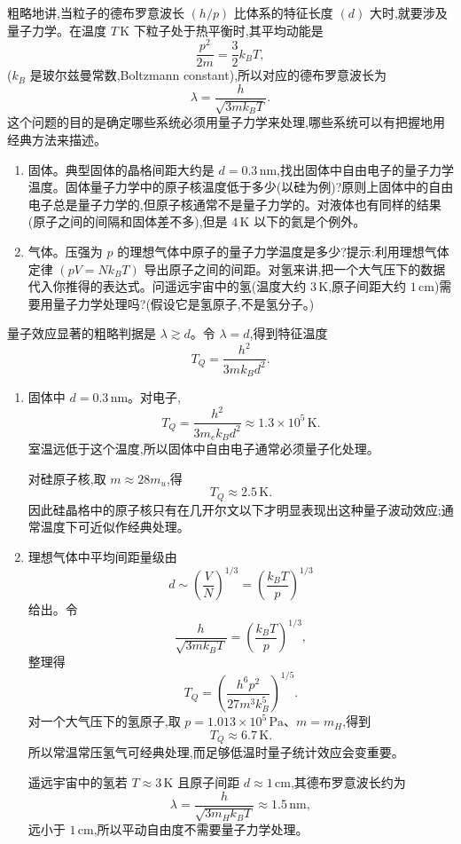 \begin{question}
粗略地讲,当粒子的德布罗意波长 $(h/p)$ 比体系的特征长度 $(d)$ 大时,就要涉及量子力学。在温度 $T\,\mathrm{K}$ 下粒子处于热平衡时,其平均动能是
\[
\frac{p^2}{2m}=\frac{3}{2}k_B T,
\]
($k_B$ 是玻尔兹曼常数,Boltzmann constant),所以对应的德布罗意波长为
\[
\lambda=\frac{h}{\sqrt{3mk_B T}}.
\tag{1.45}
\]
这个问题的目的是确定哪些系统必须用量子力学来处理,哪些系统可以有把握地用经典方法来描述。
\begin{enumerate}
\item 固体。典型固体的晶格间距大约是 $d=0.3\,\mathrm{nm}$,找出固体中自由电子的量子力学温度。固体量子力学中的原子核温度低于多少(以硅为例)?原则上固体中的自由电子总是量子力学的,但原子核通常不是量子力学的。对液体也有同样的结果(原子之间的间隔和固体差不多),但是 $4\,\mathrm{K}$ 以下的氦是个例外。
\item 气体。压强为 $p$ 的理想气体中原子的量子力学温度是多少?提示:利用理想气体定律 $(pV=Nk_BT)$ 导出原子之间的间距。对氢来讲,把一个大气压下的数据代入你推得的表达式。问遥远宇宙中的氢(温度大约 $3\,\mathrm{K}$,原子间距大约 $1\,\mathrm{cm}$)需要用量子力学处理吗?(假设它是氢原子,不是氢分子。)
\end{enumerate}
\end{question}
\begin{solution}
量子效应显著的粗略判据是 $\lambda\gtrsim d$。令 $\lambda=d$,得到特征温度
\[
T_Q=\frac{h^2}{3mk_Bd^2}.
\]
\begin{enumerate}
\item 固体中 $d=0.3\,\mathrm{nm}$。对电子,
\[
T_Q=\frac{h^2}{3m_ek_Bd^2}\approx 1.3\times10^5\,\mathrm{K}.
\]
室温远低于这个温度,所以固体中自由电子通常必须量子化处理。

对硅原子核,取 $m\approx 28m_u$,得
\[
T_Q\approx 2.5\,\mathrm{K}.
\]
因此硅晶格中的原子核只有在几开尔文以下才明显表现出这种量子波动效应;通常温度下可近似作经典处理。
\item 理想气体中平均间距量级由
\[
d\sim\left(\frac{V}{N}\right)^{1/3}=\left(\frac{k_BT}{p}\right)^{1/3}
\]
给出。令
\[
\frac{h}{\sqrt{3mk_BT}}=\left(\frac{k_BT}{p}\right)^{1/3},
\]
整理得
\[
T_Q=\left(\frac{h^6p^2}{27m^3k_B^5}\right)^{1/5}.
\]
对一个大气压下的氢原子,取 $p=1.013\times10^5\,\mathrm{Pa}$、$m=m_H$,得到
\[
T_Q\approx 6.7\,\mathrm{K}.
\]
所以常温常压氢气可经典处理,而足够低温时量子统计效应会变重要。

遥远宇宙中的氢若 $T\approx3\,\mathrm{K}$ 且原子间距 $d\approx1\,\mathrm{cm}$,其德布罗意波长约为
\[
\lambda=\frac{h}{\sqrt{3m_Hk_BT}}\approx1.5\,\mathrm{nm},
\]
远小于 $1\,\mathrm{cm}$,所以平动自由度不需要量子力学处理。
\end{enumerate}
\end{solution}
